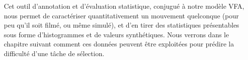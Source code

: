 	Cet outil d'annotation et d'évaluation statistique, conjugué à notre modèle VFA, nous permet de caractériser quantitativement un mouvement quelconque (pour peu qu'il soit filmé, ou même simulé), et d'en tirer des statistiques présentables sous forme d'histogrammes et de valeurs synthétiques. Nous verrons dans le chapitre suivant comment ces données peuvent être exploitées pour prédire la difficulté d'une tâche de sélection.

\clearpage
